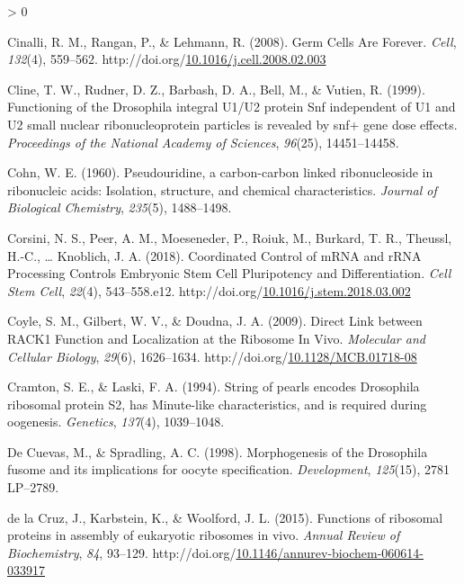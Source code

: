 \documentclass[12pt,oneside]{reedthesis}
\newlength{\cslhangindent}
\newenvironment{CSLReferences}[2] %
 {%
  \setlength{\parindent}{0pt}
  \ifodd #1 \everypar{\setlength{\hangindent}{\cslhangindent}}\ignorespaces\fi
  \ifnum #2 > 0
  \setlength{\parskip}{#2\baselineskip}
  \fi
 }%
 {}
\begin{document}
\begin{CSLReferences}{1}{0}
\leavevmode\hypertarget{ref-Cinalli2008d}{}%
Cinalli, R. M., Rangan, P., \& Lehmann, R. (2008). Germ {Cells Are Forever}. \emph{Cell}, \emph{132}(4), 559--562. http://doi.org/\href{https://doi.org/10.1016/j.cell.2008.02.003}{10.1016/j.cell.2008.02.003}

\leavevmode\hypertarget{ref-Cline1999}{}%
Cline, T. W., Rudner, D. Z., Barbash, D. A., Bell, M., \& Vutien, R. (1999). Functioning of the {Drosophila} integral {U1}/{U2} protein {Snf} independent of {U1} and {U2} small nuclear ribonucleoprotein particles is revealed by snf+ gene dose effects. \emph{Proceedings of the National Academy of Sciences}, \emph{96}(25), 14451--14458.

\leavevmode\hypertarget{ref-Cohn1960}{}%
Cohn, W. E. (1960). Pseudouridine, a carbon-carbon linked ribonucleoside in ribonucleic acids: Isolation, structure, and chemical characteristics. \emph{Journal of Biological Chemistry}, \emph{235}(5), 1488--1498.

\leavevmode\hypertarget{ref-corsiniCoordinatedControlMRNA2018}{}%
Corsini, N. S., Peer, A. M., Moeseneder, P., Roiuk, M., Burkard, T. R., Theussl, H.-C., \ldots{} Knoblich, J. A. (2018). Coordinated {Control} of {mRNA} and {rRNA Processing Controls Embryonic Stem Cell Pluripotency} and {Differentiation}. \emph{Cell Stem Cell}, \emph{22}(4), 543--558.e12. http://doi.org/\href{https://doi.org/10.1016/j.stem.2018.03.002}{10.1016/j.stem.2018.03.002}

\leavevmode\hypertarget{ref-coyleDirectLinkRACK12009}{}%
Coyle, S. M., Gilbert, W. V., \& Doudna, J. A. (2009). Direct {Link} between {RACK1 Function} and {Localization} at the {Ribosome In Vivo}. \emph{Molecular and Cellular Biology}, \emph{29}(6), 1626--1634. http://doi.org/\href{https://doi.org/10.1128/MCB.01718-08}{10.1128/MCB.01718-08}

\leavevmode\hypertarget{ref-Cramton1994a}{}%
Cramton, S. E., \& Laski, F. A. (1994). String of pearls encodes {Drosophila} ribosomal protein {S2}, has {Minute-like} characteristics, and is required during oogenesis. \emph{Genetics}, \emph{137}(4), 1039--1048.

\leavevmode\hypertarget{ref-DeCuevas1998f}{}%
De Cuevas, M., \& Spradling, A. C. (1998). Morphogenesis of the {Drosophila} fusome and its implications for oocyte specification. \emph{Development}, \emph{125}(15), 2781 LP--2789.

\leavevmode\hypertarget{ref-delacruzFunctionsRibosomalProteins2015}{}%
de la Cruz, J., Karbstein, K., \& Woolford, J. L. (2015). Functions of ribosomal proteins in assembly of eukaryotic ribosomes in vivo. \emph{Annual Review of Biochemistry}, \emph{84}, 93--129. http://doi.org/\href{https://doi.org/10.1146/annurev-biochem-060614-033917}{10.1146/annurev-biochem-060614-033917}


\end{CSLReferences}
\end{document}

